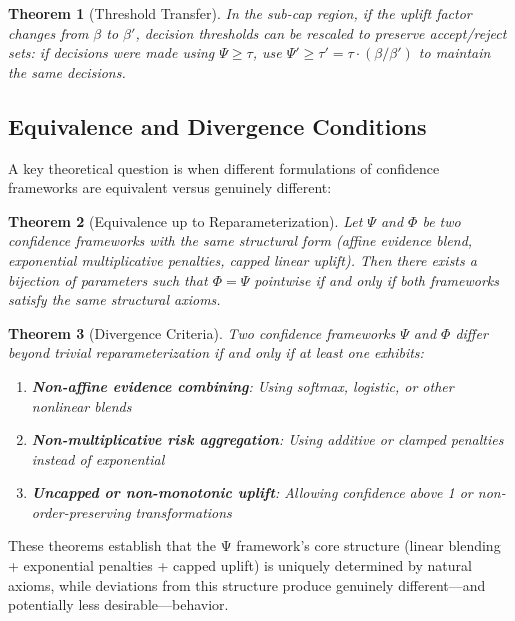 \documentclass[12pt,a4paper]{article}
\newtheorem{theorem}{Theorem}
\newcommand{\uplift}{\beta}
\newcommand{\score}{\Psi}
\begin{document}
\begin{theorem}[Threshold Transfer]
\label{thm:threshold-transfer}
In the sub-cap region, if the uplift factor changes from $\uplift$ to $\uplift'$, decision thresholds can be rescaled to preserve accept/reject sets: if decisions were made using $\score \geq \tau$, use $\score' \geq \tau' = \tau \cdot (\uplift/\uplift')$ to maintain the same decisions.
\end{theorem}

\subsection{Equivalence and Divergence Conditions}

A key theoretical question is when different formulations of confidence frameworks are equivalent versus genuinely different:

\begin{theorem}[Equivalence up to Reparameterization]
\label{thm:equivalence}
Let $\score$ and $\Phi$ be two confidence frameworks with the same structural form (affine evidence blend, exponential multiplicative penalties, capped linear uplift). Then there exists a bijection of parameters such that $\Phi = \score$ pointwise if and only if both frameworks satisfy the same structural axioms.
\end{theorem}

\begin{theorem}[Divergence Criteria]
\label{thm:divergence}
Two confidence frameworks $\score$ and $\Phi$ differ beyond trivial reparameterization if and only if at least one exhibits:
\begin{enumerate}
\item \textbf{Non-affine evidence combining}: Using softmax, logistic, or other nonlinear blends
\item \textbf{Non-multiplicative risk aggregation}: Using additive or clamped penalties instead of exponential
\item \textbf{Uncapped or non-monotonic uplift}: Allowing confidence above 1 or non-order-preserving transformations
\end{enumerate}
\end{theorem}

These theorems establish that the Ψ framework's core structure (linear blending + exponential penalties + capped uplift) is uniquely determined by natural axioms, while deviations from this structure produce genuinely different—and potentially less desirable—behavior.
\end{document}
